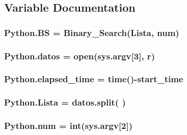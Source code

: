 \subsection{Variable Documentation}
\subsubsection[{\texorpdfstring{BS}{BS}}]{\setlength{\rightskip}{0pt plus 5cm}Python.\+BS = {\bf Binary\+\_\+\+Search}({\bf Lista}, {\bf num})}\hypertarget{namespacePython_a7ba4f492816e35070eb8a3964d6b428b}{}\label{namespacePython_a7ba4f492816e35070eb8a3964d6b428b}
\subsubsection[{\texorpdfstring{datos}{datos}}]{\setlength{\rightskip}{0pt plus 5cm}Python.\+datos = open(sys.\+argv\mbox{[}3\mbox{]}, \textquotesingle{}r\textquotesingle{})}\hypertarget{namespacePython_a6b73bac8be786503797ec7d60767507f}{}\label{namespacePython_a6b73bac8be786503797ec7d60767507f}
\subsubsection[{\texorpdfstring{elapsed\+\_\+time}{elapsed_time}}]{\setlength{\rightskip}{0pt plus 5cm}Python.\+elapsed\+\_\+time = time()-\/{\bf start\+\_\+time}}\hypertarget{namespacePython_a9cd322469f48bbf8cbf94cd42f228a23}{}\label{namespacePython_a9cd322469f48bbf8cbf94cd42f228a23}
\subsubsection[{\texorpdfstring{Lista}{Lista}}]{\setlength{\rightskip}{0pt plus 5cm}Python.\+Lista = datos.\+split(\textquotesingle{} \textquotesingle{})}\hypertarget{namespacePython_ae46206c5866c80495e52ee5db73af640}{}\label{namespacePython_ae46206c5866c80495e52ee5db73af640}
\subsubsection[{\texorpdfstring{num}{num}}]{\setlength{\rightskip}{0pt plus 5cm}Python.\+num = int(sys.\+argv\mbox{[}2\mbox{]})}\hypertarget{namespacePython_a480d858dd0b7f6a09a2c0c1fe831d8da}{}\label{namespacePython_a480d858dd0b7f6a09a2c0c1fe831d8da}
